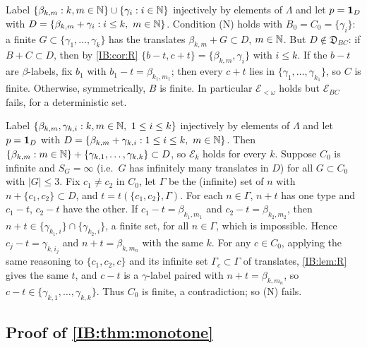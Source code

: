 \begin{example}[(N) holds but $\mathbf P(\mathcal E_{BC})=0$]
\label{IB:ex:half}
Label $\{\beta_{k,m}:k,m\in\mathbb{N}\}\cup\{\gamma_i:i\in\mathbb{N}\}$ injectively by elements of $\Lambda$ and let
$p=\mathbf{1}_D$ with $D=\{\beta_{k,m}+\gamma_i:i\le k,\ m\in\mathbb{N}\}$. Condition (N) holds with
$B_0=C_0=\{\gamma_i\}$: a finite $G\subset\{\gamma_1,\dots,\gamma_k\}$ has the translates $\beta_{k,m}+G\subset D$,
$m\in\mathbb{N}$. But $D\notin\mathfrak D_{BC}$: if $B+C\subset D$, then by \cref{IB:cor:R}
$\{b-t,c+t\}=\{\beta_{k,m},\gamma_i\}$ with $i\le k$. If the $b-t$ are $\beta$-labels, fix $b_1$ with
$b_1-t=\beta_{k_1,m_1}$; then every $c+t$ lies in $\{\gamma_1,\dots,\gamma_{k_1}\}$, so $C$ is finite.
Otherwise, symmetrically, $B$ is finite. In particular $\mathcal E_{<\omega}$ holds but
$\mathcal E_{BC}$ fails, for a deterministic set.
\end{example}

\begin{example}[$\mathbf P(\mathcal E_{<\omega})=1$ but (N) fails]
\label{IB:ex:rigid}
Label $\{\beta_{k,m},\gamma_{k,i}:k,m\in\mathbb{N},\ 1\le i\le k\}$ injectively by elements of $\Lambda$ and let
$p=\mathbf{1}_D$ with $D=\{\beta_{k,m}+\gamma_{k,i}:1\le i\le k,\ m\in\N\}$. Then
$\{\beta_{k,m}:m\in\mathbb{N}\}+\{\gamma_{k,1},\dots,\gamma_{k,k}\}\subset D$, so $\mathcal E_k$ holds for every $k$.
Suppose $C_0$ is infinite and $S_G=\infty$ (i.e.\ $G$ has infinitely many translates in
$D$) for all $G\subset C_0$ with $|G|\le3$. Fix $c_1\ne c_2$ in $C_0$, let $\Gamma$ be the
(infinite) set of $n$ with $n+\{c_1,c_2\}\subset D$, and $t=t(\{c_1,c_2\},\Gamma)$. For each
$n\in\Gamma$, $n+t$ has one type and $c_1-t$, $c_2-t$ have the other. If $c_1-t=\beta_{k_1,m_1}$ and
$c_2-t=\beta_{k_2,m_2}$, then $n+t\in\{\gamma_{k_1,i}\}\cap\{\gamma_{k_2,i}\}$, a finite set, for all
$n\in\Gamma$, which is impossible. Hence $c_j-t=\gamma_{k,i_j}$ and $n+t=\beta_{k,m_n}$ with the same
$k$. For any $c\in C_0$, applying the same reasoning to $\{c_1,c_2,c\}$ and its
infinite set $\Gamma_c\subset\Gamma$ of translates, \cref{IB:lem:R} gives the same $t$, and $c-t$ is a
$\gamma$-label paired with $n+t=\beta_{k,m_n}$, so $c-t\in\{\gamma_{k,1},\dots,\gamma_{k,k}\}$. Thus $C_0$
is finite, a contradiction; so (N) fails.
\end{example}

\subsection{Proof of \texorpdfstring{\cref{IB:thm:monotone}}{the monotone theorem}}

